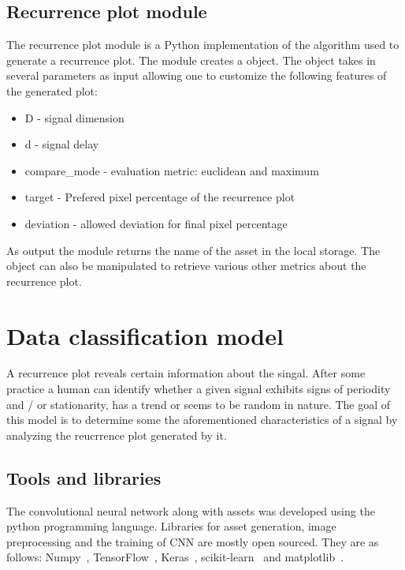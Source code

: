 \documentclass[a4paper,12pt,fleqn]{article}
\begin{document}
\subsection{Recurrence plot module}
\label{sec:recurrence_plot_module}
The recurrence plot module is a Python implementation of the algorithm used to generate a recurrence plot.
The module creates a  object.
The object takes in several parameters as input allowing one to customize the following features of the generated plot:
\begin{itemize}
  \item D - signal dimension
  \item d - signal delay
  \item compare\_mode - evaluation metric: euclidean and maximum
  \item target - Prefered pixel percentage of the recurrence plot
  \item deviation - allowed deviation for final pixel percentage
\end{itemize}
As output the module returns the name of the asset in the local storage.
The object can also be manipulated to retrieve various other metrics about the recurrence plot.


\section{Data classification model}
A recurrence plot reveals certain information about the singal.
After some practice a human can identify whether a given signal exhibits signs of periodity and / or stationarity, has a trend or seems to be random in nature.
The goal of this model is to determine some the aforementioned characteristics of a signal by analyzing the reucrrence plot generated by it.


\subsection{Tools and libraries}
The convolutional neural network along with assets was developed using the python programming language. Libraries for asset generation, image preprocessing and the training of CNN are mostly open sourced. They are as follows: Numpy~\cite{numpy}, TensorFlow~\cite{tensorflow}, Keras~\cite{keras}, scikit-learn~\cite{scikit-learn} and matplotlib~\cite{matplotlib}.
\end{document}
